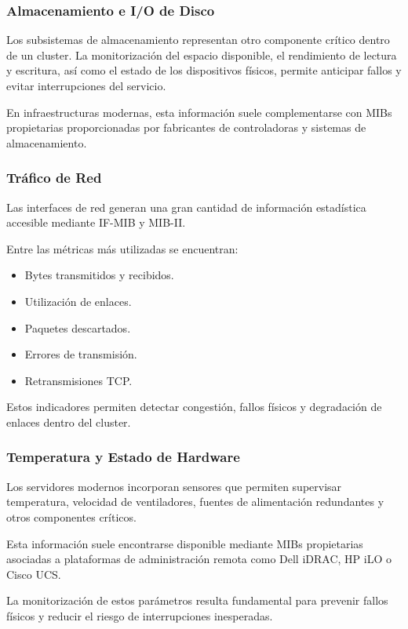 \subsubsection{Almacenamiento e I/O de Disco}

Los subsistemas de almacenamiento representan otro componente crítico dentro de un cluster. La monitorización del espacio disponible, el rendimiento de lectura y escritura, así como el estado de los dispositivos físicos, permite anticipar fallos y evitar interrupciones del servicio.

En infraestructuras modernas, esta información suele complementarse con MIBs propietarias proporcionadas por fabricantes de controladoras y sistemas de almacenamiento.

\subsubsection{Tráfico de Red}

Las interfaces de red generan una gran cantidad de información estadística accesible mediante IF-MIB y MIB-II.

Entre las métricas más utilizadas se encuentran:

\begin{itemize}
\item Bytes transmitidos y recibidos.
\item Utilización de enlaces.
\item Paquetes descartados.
\item Errores de transmisión.
\item Retransmisiones TCP.
\end{itemize}

Estos indicadores permiten detectar congestión, fallos físicos y degradación de enlaces dentro del cluster.

\subsubsection{Temperatura y Estado de Hardware}

Los servidores modernos incorporan sensores que permiten supervisar temperatura, velocidad de ventiladores, fuentes de alimentación redundantes y otros componentes críticos.

Esta información suele encontrarse disponible mediante MIBs propietarias asociadas a plataformas de administración remota como Dell iDRAC, HP iLO o Cisco UCS.

La monitorización de estos parámetros resulta fundamental para prevenir fallos físicos y reducir el riesgo de interrupciones inesperadas.

